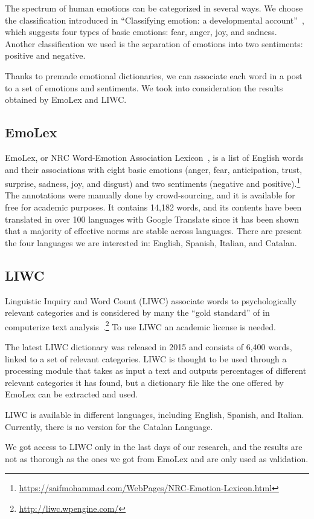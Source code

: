 The spectrum of human emotions can be categorized in several ways. We choose the classification introduced in “Classifying emotion: a developmental account”~\cite{zinck2008classifying}, which suggests four types of basic emotions: fear, anger, joy, and sadness. Another classification we used is the separation of emotions into two sentiments: positive and negative.

Thanks to premade emotional dictionaries, we can associate each word in a post to a set of emotions and sentiments. We took into consideration the results obtained by EmoLex and LIWC.

\subsection{EmoLex}
EmoLex, or NRC Word-Emotion Association Lexicon~\cite{mohammad2013nrc}, is a list of English words and their associations with eight basic emotions (anger, fear, anticipation, trust, surprise, sadness, joy, and disgust) and two sentiments (negative and positive).\footnote{\url{https://saifmohammad.com/WebPages/NRC-Emotion-Lexicon.html}} The annotations were manually done by crowd-sourcing, and it is available for free for academic purposes. It contains 14,182 words, and its contents have been translated in over 100 languages with Google Translate since it has been shown that a majority of effective norms are stable across languages. There are present the four languages we are interested in: English, Spanish, Italian, and Catalan.

\subsection{LIWC}
Linguistic Inquiry and Word Count (LIWC) associate words to psychologically relevant categories and is considered by many the “gold standard” of in computerize text analysis~\cite{tausczik2010psychological}.\footnote{\url{http://liwc.wpengine.com/}} To use LIWC an academic license is needed.

The latest LIWC dictionary was released in 2015 and consists of 6,400 words, linked to a set of relevant categories. LIWC is thought to be used through a processing module that takes as input a text and outputs percentages of different relevant categories it has found, but a dictionary file like the one offered by EmoLex can be extracted and used.

LIWC is available in different languages, including English, Spanish, and Italian. Currently, there is no version for the Catalan Language.

We got access to LIWC only in the last days of our research, and the results are not as thorough as the ones we got from EmoLex and are only used as validation.
